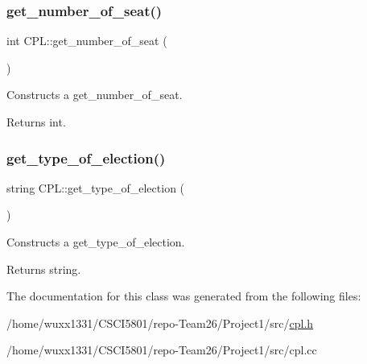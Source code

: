\subsubsection{\texorpdfstring{get\+\_\+number\+\_\+of\+\_\+seat()}{get\_number\_of\_seat()}}
{\footnotesize\ttfamily int C\+P\+L\+::get\+\_\+number\+\_\+of\+\_\+seat (\begin{DoxyParamCaption}{ }\end{DoxyParamCaption})}



Constructs a get\+\_\+number\+\_\+of\+\_\+seat. 

\begin{DoxyReturn}{Returns}
int. 
\end{DoxyReturn}
\mbox{\label{classCPL_a80e84330c07d424d857836538515be99}} 
\subsubsection{\texorpdfstring{get\+\_\+type\+\_\+of\+\_\+election()}{get\_type\_of\_election()}}
{\footnotesize\ttfamily string C\+P\+L\+::get\+\_\+type\+\_\+of\+\_\+election (\begin{DoxyParamCaption}{ }\end{DoxyParamCaption})}



Constructs a get\+\_\+type\+\_\+of\+\_\+election. 

\begin{DoxyReturn}{Returns}
string. 
\end{DoxyReturn}


The documentation for this class was generated from the following files\+:\begin{DoxyCompactItemize}
\item 
/home/wuxx1331/\+C\+S\+C\+I5801/repo-\/\+Team26/\+Project1/src/\hyperlink{cpl_8h}{cpl.\+h}\item 
/home/wuxx1331/\+C\+S\+C\+I5801/repo-\/\+Team26/\+Project1/src/cpl.\+cc\end{DoxyCompactItemize}
